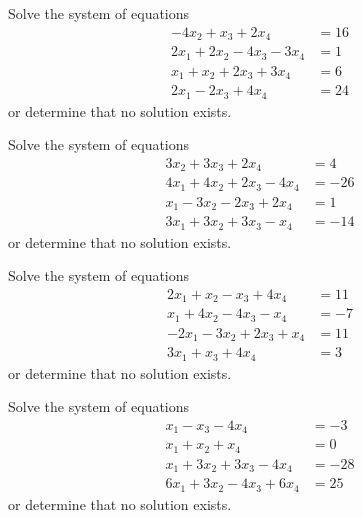 \begin{exercise}\ansMark%
Solve the system of equations
\begin{equation*}
\begin{split}
-4x_2 + x_3 + 2x_4 &= 16 \\
2x_1 + 2x_2 - 4x_3 - 3x_4 &= 1 \\
x_1 + x_2 + 2x_3 + 3x_4 &= 6 \\
2x_1 - 2x_3 + 4x_4 &= 24
\end{split}
\end{equation*}
or determine that no solution exists. 
\end{exercise}
%

\begin{exercise}\ansMark%
Solve the system of equations
\begin{equation*}
\begin{split}
3x_2 + 3x_3 + 2x_4 &= 4 \\
4x_1 + 4x_2 + 2x_3 - 4x_4 &= -26 \\
x_1 - 3x_2 -2x_3 + 2x_4 &= 1 \\
3x_1 + 3x_2 + 3x_3  - x_4 &= -14
\end{split}
\end{equation*}
or determine that no solution exists. 
\end{exercise}
%

\begin{exercise}\ansMark%
Solve the system of equations
\begin{equation*}
\begin{split}
2x_1 + x_2 - x_3 + 4x_4 &= 11 \\
x_1 + 4x_2  - 4x_3 - x_4 &= -7 \\
-2x_1 - 3x_2 + 2x_3 + x_4 &= 11 \\
3x_1 + x_3  + 4x_4 &= 3
\end{split}
\end{equation*}
or determine that no solution exists. 
\end{exercise}
%

\begin{exercise}\ansMark%
Solve the system of equations
\begin{equation*}
\begin{split}
x_1 - x_3 - 4x_4 &= -3 \\
x_1 + x_2 + x_4 &= 0\\
x_1 + 3x_2 + 3x_3 - 4x_4 &= -28 \\
6x_1 + 3x_2 - 4x_3 + 6x_4 &= 25
\end{split}
\end{equation*}
or determine that no solution exists. 
\end{exercise}
%

